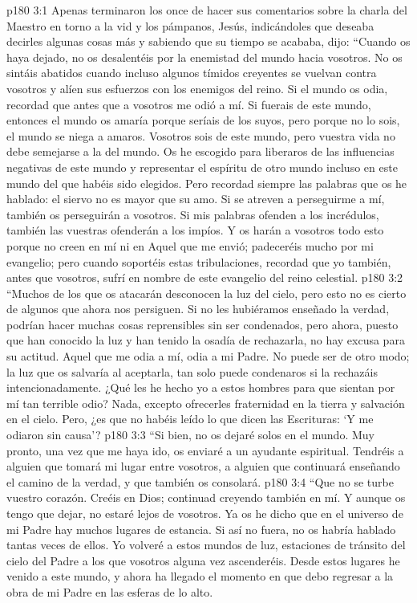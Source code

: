 \vs p180 3:1 Apenas terminaron los once de hacer sus comentarios sobre la charla del Maestro en torno a la vid y los pámpanos, Jesús, indicándoles que deseaba decirles algunas cosas más y sabiendo que su tiempo se acababa, dijo: “Cuando os haya dejado, no os desalentéis por la enemistad del mundo hacia vosotros. No os sintáis abatidos cuando incluso algunos tímidos creyentes se vuelvan contra vosotros y alíen sus esfuerzos con los enemigos del reino. Si el mundo os odia, recordad que antes que a vosotros me odió a mí. Si fuerais de este mundo, entonces el mundo os amaría porque seríais de los suyos, pero porque no lo sois, el mundo se niega a amaros. Vosotros sois de este mundo, pero vuestra vida no debe semejarse a la del mundo. Os he escogido para liberaros de las influencias negativas de este mundo y representar el espíritu de otro mundo incluso en este mundo del que habéis sido elegidos. Pero recordad siempre las palabras que os he hablado: el siervo no es mayor que su amo. Si se atreven a perseguirme a mí, también os perseguirán a vosotros. Si mis palabras ofenden a los incrédulos, también las vuestras ofenderán a los impíos. Y os harán a vosotros todo esto porque no creen en mí ni en Aquel que me envió; padeceréis mucho por mi evangelio; pero cuando soportéis estas tribulaciones, recordad que yo también, antes que vosotros, sufrí en nombre de este evangelio del reino celestial.
\vs p180 3:2 “Muchos de los que os atacarán desconocen la luz del cielo, pero esto no es cierto de algunos que ahora nos persiguen. Si no les hubiéramos enseñado la verdad, podrían hacer muchas cosas reprensibles sin ser condenados, pero ahora, puesto que han conocido la luz y han tenido la osadía de rechazarla, no hay excusa para su actitud. Aquel que me odia a mí, odia a mi Padre. No puede ser de otro modo; la luz que os salvaría al aceptarla, tan solo puede condenaros si la rechazáis intencionadamente. ¿Qué les he hecho yo a estos hombres para que sientan por mí tan terrible odio? Nada, excepto ofrecerles fraternidad en la tierra y salvación en el cielo. Pero, ¿es que no habéis leído lo que dicen las Escrituras: ‘Y me odiaron sin causa’?
\vs p180 3:3 “Si bien, no os dejaré solos en el mundo. Muy pronto, una vez que me haya ido, os enviaré a un ayudante espiritual. Tendréis a alguien que tomará mi lugar entre vosotros, a alguien que continuará enseñando el camino de la verdad, y que también os consolará.
\vs p180 3:4 “Que no se turbe vuestro corazón. Creéis en Dios; continuad creyendo también en mí. Y aunque os tengo que dejar, no estaré lejos de vosotros. Ya os he dicho que en el universo de mi Padre hay muchos lugares de estancia. Si así no fuera, no os habría hablado tantas veces de ellos. Yo volveré a estos mundos de luz, estaciones de tránsito del cielo del Padre a los que vosotros alguna vez ascenderéis. Desde estos lugares he venido a este mundo, y ahora ha llegado el momento en que debo regresar a la obra de mi Padre en las esferas de lo alto.

